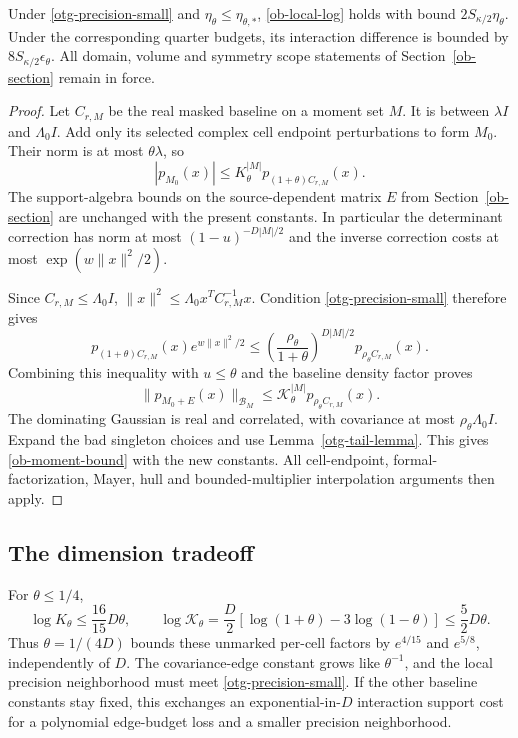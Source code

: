 \begin{theorem}\label{otg-strict-theorem}
Under \eqref{otg-precision-small} and
$\mathcal\eta_\theta\le\mathcal\eta_{\theta,*}$,
\eqref{ob-local-log} holds with bound
$2S_{\kappa/2}\mathcal\eta_\theta$.
Under the corresponding quarter budgets, its interaction
difference is bounded by
$8S_{\kappa/2}\mathcal\epsilon_\theta$.
All domain, volume and symmetry scope statements of
Section~\ref{ob-section} remain in force.
\end{theorem}
\begin{proof}
Let $C_{r,M}$ be the real masked baseline on a moment set $M$.
It is between $\lambda I$ and $\Lambda_0I$.
Add only its selected complex cell endpoint perturbations to
form $M_0$. Their norm is at most $\theta\lambda$, so
\[
 |p_{M_0}(x)|
          \le K_\theta^{|M|}p_{(1+\theta)C_{r,M}}(x).
\]
The support-algebra bounds on the source-dependent matrix
$E$ from Section~\ref{ob-section} are unchanged with the
present constants. In particular the determinant correction
has norm at most $(1-u)^{-D|M|/2}$ and the inverse correction
costs at most $\exp(w\|x\|^2/2)$.

Since $C_{r,M}\le\Lambda_0I$,
$\|x\|^2\le\Lambda_0x^TC_{r,M}^{-1}x$.
Condition \eqref{otg-precision-small} therefore gives
\[
 p_{(1+\theta)C_{r,M}}(x)e^{w\|x\|^2/2}
 \le\left(\frac{\rho_\theta}{1+\theta}\right)^{D|M|/2}
                                  p_{\rho_\theta C_{r,M}}(x).
\]
Combining this inequality with $u\le\theta$ and the
baseline density factor proves
\begin{equation}\label{otg-algebra-density}
 \|p_{M_0+E}(x)\|_{\mathcal B_M}
       \le\mathcal K_\theta^{|M|}
                                  p_{\rho_\theta C_{r,M}}(x).
\end{equation}
The dominating Gaussian is real and correlated, with
covariance at most $\rho_\theta\Lambda_0I$.
Expand the bad singleton choices and use
Lemma~\ref{otg-tail-lemma}. This gives
\eqref{ob-moment-bound} with the new constants.
All cell-endpoint, formal-factorization, Mayer, hull and
bounded-multiplier interpolation arguments then apply.
\end{proof}

\subsection{The dimension tradeoff}

For $\theta\le1/4$,
\[
 \log K_\theta\le\frac{16}{15}D\theta,\qquad
 \log\mathcal K_\theta
 =\frac D2[\log(1+\theta)-3\log(1-\theta)]
                   \le\frac52D\theta .
\]
Thus $\theta=1/(4D)$ bounds these unmarked per-cell factors
by $e^{4/15}$ and $e^{5/8}$, independently of $D$.
The covariance-edge constant grows like $\theta^{-1}$,
and the local precision neighborhood must meet
\eqref{otg-precision-small}. If the other baseline constants
stay fixed, this exchanges an exponential-in-$D$ interaction
support cost for a polynomial edge-budget loss and a smaller
precision neighborhood.

